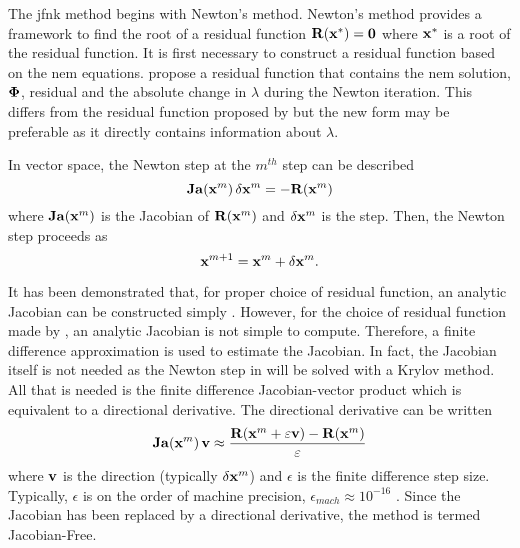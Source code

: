     The \gls{jfnk} method begins with Newton's method. Newton's method provides
    a framework to find the root of a residual function 
    $\mathbf{R}(\mathbf{x}^*) = \mathbf{0}$ where $\mathbf{x}^*$ is a root of the residual 
    function. It is first necessary to construct a residual function based on
    the \gls{nem} equations. \citeauthor{qe2paper} propose a residual function
    that contains the \gls{nem} solution, $\mathbf{\Phi}$, residual and the absolute
    change in $\lambda$ during the Newton iteration. This differs from the
    residual function proposed by \citeauthor{gill_azmy} but the new form may be
    preferable as it directly contains information about $\lambda$.
    
    In vector space, the Newton step at the $m^{th}$ step can be described 
    \begin{equation}
      \label{eq:newton_step}
      \mathbf{Ja} (\mathbf{x}^m) \, \delta\mathbf{x}^m = - \mathbf{R}(\mathbf{x}^m)
    \end{equation}
    where $\mathbf{Ja}(\mathbf{x}^m)$ is the Jacobian of $\mathbf{R}(\mathbf{x}^m)$ and 
    $\delta\mathbf{x}^m$ is the step. Then, the Newton step proceeds as
    \begin{equation}
      \mathbf{x}^{m+1} = \mathbf{x}^{m} + \delta\mathbf{x}^{m}.
    \end{equation}

    It has been demonstrated that, for proper choice of residual function, an
    analytic Jacobian can be constructed simply \cite{gill_azmy}. However, for
    the choice of residual function made by \citeauthor{qe2paper}, an analytic
    Jacobian is not simple to compute. Therefore, a finite difference
    approximation is used to estimate the Jacobian. In fact, the Jacobian itself
    is not needed as the Newton step in  will be solved
    with a Krylov method. All that is needed is the finite difference 
    Jacobian-vector product which is equivalent to a directional derivative. The
    directional derivative can be written
    \begin{equation}
      \label{eq:dirder}
      \mathbf{Ja}(\mathbf{x}^m) \, \mathbf{v} \approx \frac{\mathbf{R}(\mathbf{x}^m + \varepsilon \mathbf{v}) - 
        \mathbf{R}(\mathbf{x}^m)}{\varepsilon}
    \end{equation}
    where $\mathbf{v}$ is the direction (typically $\delta\mathbf{x}^m$) and $\epsilon$ is the
    finite difference step size. Typically, $\epsilon$ is on the order of
    machine precision, $\epsilon_{mach} \approx 10^{-16}$
    \cite{qe2paper,gill_azmy,textbookkelley}. Since the Jacobian has been
    replaced by a directional derivative, the method is termed Jacobian-Free.

